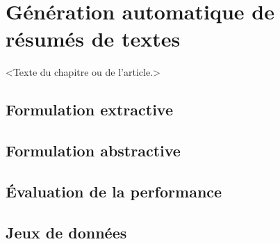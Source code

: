 \chapter{Génération automatique de résumés de textes}     %
\label{chap:generation_resumes}                   %

<Texte du chapitre ou de l'article.>

\section{Formulation extractive}

\section{Formulation abstractive}

\section{Évaluation de la performance}

\section{Jeux de données}